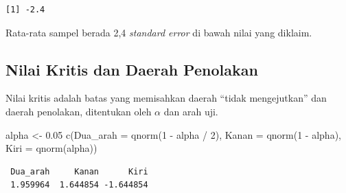 \documentclass[
  indonesian,
  letterpaper,
]{book}
\newenvironment{Shaded}{\begin{snugshade}}{\end{snugshade}}
\newcommand{\AttributeTok}[1]{\textcolor[rgb]{0.40,0.45,0.13}{#1}}
\newcommand{\DecValTok}[1]{\textcolor[rgb]{0.68,0.00,0.00}{#1}}
\newcommand{\FloatTok}[1]{\textcolor[rgb]{0.68,0.00,0.00}{#1}}
\newcommand{\FunctionTok}[1]{\textcolor[rgb]{0.28,0.35,0.67}{#1}}
\newcommand{\NormalTok}[1]{\textcolor[rgb]{0.00,0.23,0.31}{#1}}
\newcommand{\OtherTok}[1]{\textcolor[rgb]{0.00,0.23,0.31}{#1}}
\newcommand{\SpecialCharTok}[1]{\textcolor[rgb]{0.37,0.37,0.37}{#1}}
\begin{document}
\begin{verbatim}
[1] -2.4
\end{verbatim}

Rata-rata sampel berada 2,4 \emph{standard error} di bawah nilai yang
diklaim.

\subsection{Nilai Kritis dan Daerah
Penolakan}\label{nilai-kritis-dan-daerah-penolakan}

Nilai kritis adalah batas yang memisahkan daerah ``tidak mengejutkan''
dan daerah penolakan, ditentukan oleh \(\alpha\) dan arah uji.

\begin{Shaded}
\begin{Highlighting}[]
\NormalTok{alpha }\OtherTok{\textless{}{-}} \FloatTok{0.05}
\FunctionTok{c}\NormalTok{(}\AttributeTok{Dua\_arah =} \FunctionTok{qnorm}\NormalTok{(}\DecValTok{1} \SpecialCharTok{{-}}\NormalTok{ alpha }\SpecialCharTok{/} \DecValTok{2}\NormalTok{), }\AttributeTok{Kanan =} \FunctionTok{qnorm}\NormalTok{(}\DecValTok{1} \SpecialCharTok{{-}}\NormalTok{ alpha), }\AttributeTok{Kiri =} \FunctionTok{qnorm}\NormalTok{(alpha))}
\end{Highlighting}
\end{Shaded}

\begin{verbatim}
 Dua_arah     Kanan      Kiri 
 1.959964  1.644854 -1.644854 
\end{verbatim}
\end{document}
